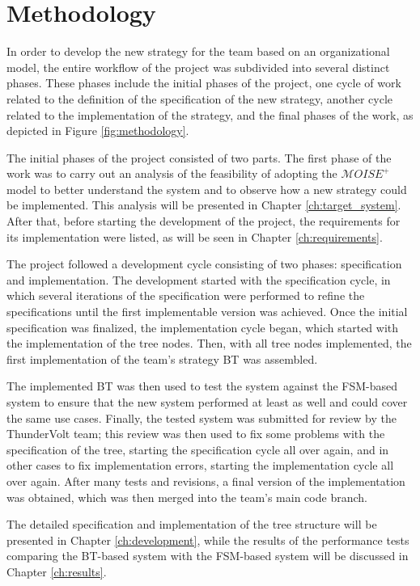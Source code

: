 \def \MOISEp {$\mathcal{M}OISE^+$ } 

\chapter{Methodology}
\label{ch:methodology}

In order to develop the new strategy for the team based on an organizational model, the entire workflow of the project was subdivided into several distinct phases. These phases include the initial phases of the project, one cycle of work related to the definition of the specification of the new strategy, another cycle related to the implementation of the strategy, and the final phases of the work, as depicted in Figure \ref{fig:methodology}.

The initial phases of the project consisted of two parts. The first phase of the work was to carry out an analysis of the feasibility of adopting the \MOISEp \cite{MOISEp} model to better understand the system and to observe how a new strategy could be implemented. This analysis will be presented in Chapter \ref{ch:target_system}. After that, before starting the development of the project, the requirements for its implementation were listed, as will be seen in Chapter \ref{ch:requirements}.

The project followed a development cycle consisting of two phases: specification and implementation. The development started with the specification cycle, in which several iterations of the specification were performed to refine the specifications until the first implementable version was achieved. Once the initial specification was finalized, the implementation cycle began, which started with the implementation of the tree nodes. Then, with all tree nodes implemented, the first implementation of the team's strategy BT was assembled. 

The implemented BT was then used to test the system against the FSM-based system to ensure that the new system performed at least as well and could cover the same use cases. Finally, the tested system was submitted for review by the ThunderVolt team; this review was then used to fix some problems with the specification of the tree, starting the specification cycle all over again, and in other cases to fix implementation errors, starting the implementation cycle all over again. After many tests and revisions, a final version of the implementation was obtained, which was then merged into the team's main code branch. 

The detailed specification and implementation of the tree structure will be presented in Chapter \ref{ch:development}, while the results of the performance tests comparing the BT-based system with the FSM-based system will be discussed in Chapter \ref{ch:results}.

